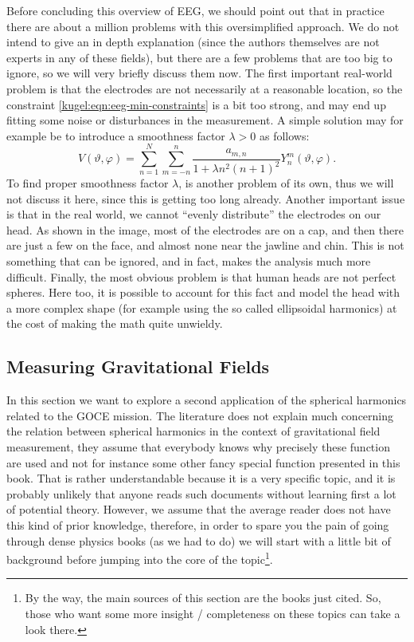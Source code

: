 Before concluding this overview of EEG, we should point out that in practice
there are about a million problems with this oversimplified approach. We do not
intend to give an in depth explanation (since the authors themselves are not
experts in any of these fields), but there are a few problems that are too big
to ignore, so we will very briefly discuss them now. The first important
real-world problem is that the electrodes are not necessarily at a reasonable
location, so the constraint \eqref{kugel:eqn:eeg-min-constraints} is a bit too
strong, and may end up fitting some noise or disturbances in the measurement. A
simple solution may for example be to introduce a smoothness factor $\lambda >
0$ as follows:
\begin{equation}
  V(\vartheta, \varphi) = \sum_{n=1}^N \sum_{m=-n}^n 
    \frac{a_{m,n}}{1 + \lambda n^2(n+1)^2} Y^m_n(\vartheta, \varphi).
\end{equation}
To find proper smoothness factor $\lambda$, is another problem of its own, thus
we will not discuss it here, since this is getting too long already. Another
important issue is that in the real world, we cannot ``evenly distribute'' the
electrodes on our head. As shown in the image, most of the electrodes are on a
cap, and then there are just a few on the face, and almost none near the jawline
and chin. This is not something that can be ignored, and in fact, makes the
analysis much more difficult. Finally, the most obvious problem is that human
heads are not perfect spheres. Here too, it is possible to account for this fact
and model the head with a more complex shape (for example using the so called
ellipsoidal harmonics) at the cost of making the math quite unwieldy.

\subsection{Measuring Gravitational Fields}

In this section we want to explore a second application of the spherical
harmonics related to the GOCE mission.  The literature does not explain much
concerning the relation between spherical harmonics in the context of
gravitational field measurement, they assume that everybody knows why precisely
these function are used and not for instance some other fancy special function
presented in this book. That is rather understandable because it is a very
specific topic, and it is probably unlikely that anyone reads such documents
without learning first a lot of potential theory. However, we assume that the
average reader does not have this kind of prior knowledge, therefore, in order
to spare you the pain of going through dense physics books \cite{blakely_1995,
hofmann2005physical, griffiths_introduction_2015} (as we had to do) we will
start with a little bit of background before jumping into the core of the
topic\footnote{By the way, the main sources of this section are the books just
cited.  So, those who want some more insight / completeness on these topics can
take a look there.}.

